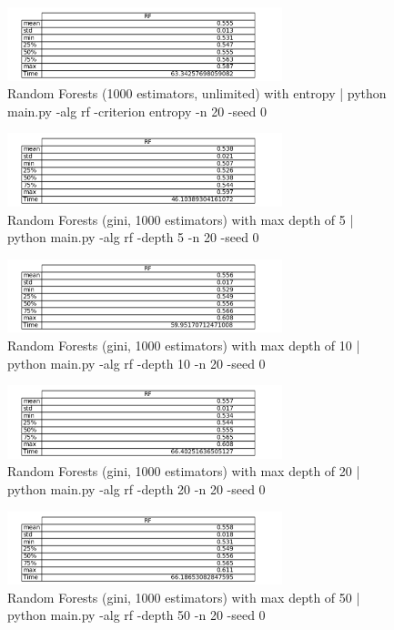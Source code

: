 \documentclass{article}
\begin{document}
\begin{figure}
\begin{center}
\includegraphics[width=8cm]{images/rf_entropy}
\caption{Random Forests (1000 estimators, unlimited) with entropy | python main.py -alg rf -criterion entropy -n 20 -seed 0}
\end{center}
\end{figure}
\begin{figure}
\begin{center}
\includegraphics[width=8cm]{images/rf_d5}
\caption{Random Forests (gini, 1000 estimators) with max depth of 5 | python main.py -alg rf -depth 5 -n 20 -seed 0}
\end{center}
\end{figure}
\begin{figure}
\begin{center}
\includegraphics[width=8cm]{images/rf_d10}
\caption{Random Forests (gini, 1000 estimators) with max depth of 10 | python main.py -alg rf -depth 10 -n 20 -seed 0}
\end{center}
\end{figure}
\begin{figure}
\begin{center}
\includegraphics[width=8cm]{images/rf_d20}
\caption{Random Forests (gini, 1000 estimators) with max depth of 20 | python main.py -alg rf -depth 20 -n 20 -seed 0}
\end{center}
\end{figure}
\begin{figure}
\begin{center}
\includegraphics[width=8cm]{images/rf_d50}
\caption{Random Forests (gini, 1000 estimators) with max depth of 50 | python main.py -alg rf -depth 50 -n 20 -seed 0}
\end{center}
\end{figure}
\end{document}
